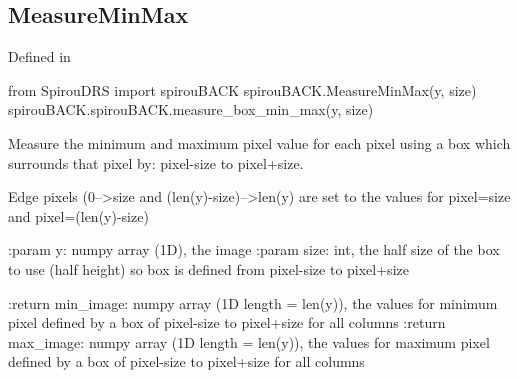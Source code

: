 \noindent\begin{minipage}{\textwidth}
\subsection{MeasureMinMax}

Defined in \spirouBACK{}

\begin{pythonbox}
from SpirouDRS import spirouBACK
spirouBACK.MeasureMinMax(y, size)
spirouBACK.spirouBACK.measure_box_min_max(y, size)
\end{pythonbox}

\begin{pythondocstring}
Measure the minimum and maximum pixel value for each pixel using a box which
surrounds that pixel by:  pixel-size to pixel+size.

Edge pixels (0-->size and (len(y)-size)-->len(y) are
set to the values for pixel=size and pixel=(len(y)-size)

:param y: numpy array (1D), the image
:param size: int, the half size of the box to use (half height)
             so box is defined from  pixel-size to pixel+size

:return min_image: numpy array (1D length = len(y)), the values
                   for minimum pixel defined by a box of pixel-size to
                   pixel+size for all columns
:return max_image: numpy array (1D length = len(y)), the values
                   for maximum pixel defined by a box of pixel-size to
                   pixel+size for all columns
\end{pythondocstring}
\end{minipage}

